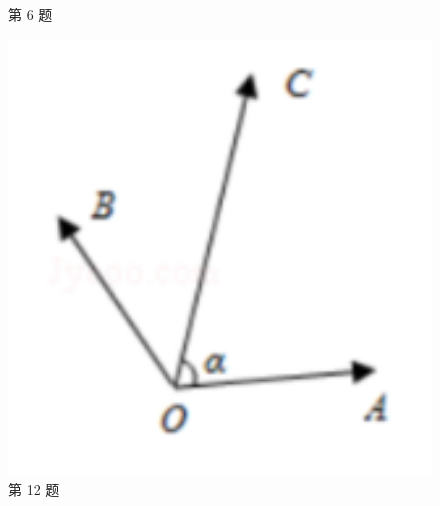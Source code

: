\documentclass[12pt,space]{ctexart} %
\begin{document}
\begin{enumerate}[itemsep=-0.3em,topsep=0pt]
\begin{figure}[H]
\begin{minipage}[b]{0.25\textwidth}
      \caption{第 6 题}\label{fig:b}
    \end{minipage}
    \begin{minipage}[b]{0.25\textwidth}
      \centering
      \includegraphics[width=1\textwidth]{Image/js-12.png}
      \caption{第 12 题}\label{fig:t12}
    \end{minipage}
  \end{figure}


\end{enumerate}
\end{document}
